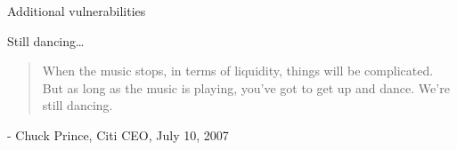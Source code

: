 \begin{frame}{Additional vulnerabilities}

\end{frame}



\begin{frame}{Still dancing\ldots}

\begin{quote}
When the music stops, in terms of liquidity, things will be complicated. But as long as the music is playing, you’ve got to get up and dance. We’re still dancing.
\end{quote}
\begin{center}
- Chuck Prince, Citi CEO, July 10, 2007
\end{center}

\end{frame}